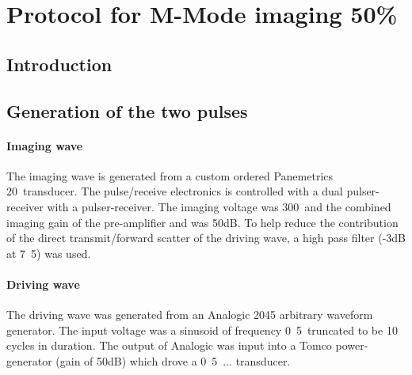 
\chapter{Protocol for M-Mode imaging 50\%}\label{ch:DPR500_protocol}





\section{Introduction}



\section{Generation of the two pulses}
\subsubsection{Imaging wave}
The imaging wave is generated from a custom ordered Panemetrics \unit{20}\mega\hertz\
transducer.
The pulse/receive electronics is controlled 
with a \JsrUltrasonics {} dual pulser-receiver
with a  pulser-receiver.
The imaging voltage was \unit{300}\volt\ and the combined imaging gain 
of the pre-amplifier and \DPR500 was \unit{50}dB.
To help reduce the contribution of the direct transmit/forward scatter of
the driving wave, a high pass filter (-\unit{3}dB at \unit{7.5}\mega\hertz)
was used.

\subsubsection{Driving wave}
The driving wave was generated from an  Analogic 2045 arbitrary waveform generator.
The input voltage was a sinusoid of frequency \unit{0.5}\mega\hertz\ 
truncated to be 10 cycles in duration. 
The output of Analogic was input into a Tomco power-generator (gain of \unit{50}dB)
which drove a \unit{0.5}\mega\hertz\ ... transducer.

